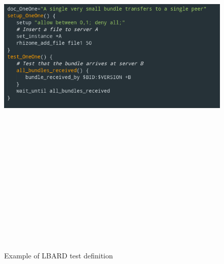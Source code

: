 \begin{figure}
    \begin{centering}
        \includegraphics[width=14cm,height=20cm,keepaspectratio]{Figures/testdefinitionexample.png}
        \caption{Example of LBARD test definition}
        \label{fig:testDefinition}
    \end{centering}
\end{figure}


